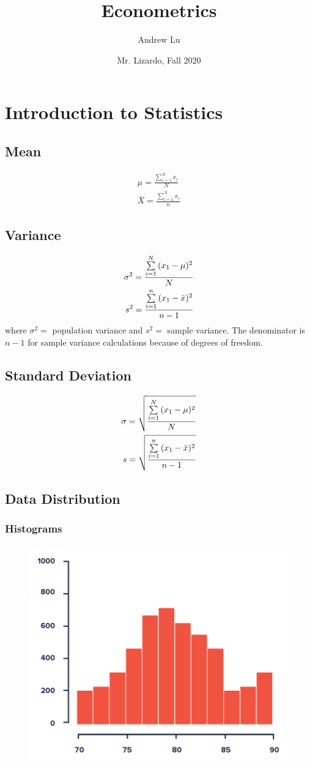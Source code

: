 \documentclass[12pt]{article}
\title{Econometrics}
\author{Andrew Lu}
\date{Mr. Lizardo, Fall 2020}
\numberwithin{equation}{section}
\begin{document}
    \maketitle
    \label{sec:top}
    \tableofcontents

\section{Introduction to Statistics}

\subsection{Mean}
\begin{align}
    \mu=\frac{\sum\limits_{i=1}^{N}{x_i}}{N} \\
    \overline{X}=\frac{\sum\limits_{i=1}^{N}{x_i}}{n}
\end{align}

\subsection{Variance}
\begin{align}
    \sigma^2=\frac{\sum\limits_{i=1}^{N}{(x_1-\mu)^2}}{N} \\
    s^2=\frac{\sum\limits_{i=1}^{n}{(x_1-\Bar{x})^2}}{n-1}
\end{align}
where $\sigma^2=$ population variance and $s^2=$ sample variance. The denominator is $n-1$ for sample variance calculations because of degrees of freedom.

\subsection{Standard Deviation}
\begin{align}
    \sigma=\sqrt{\frac{\sum\limits_{i=1}^{N}{(x_1-\mu)^2}}{N}} \\
    s=\sqrt{\frac{\sum\limits_{i=1}^{n}{(x_1-\Bar{x})^2}}{n-1}}
\end{align}

\subsection{Data Distribution}
\subsubsection{Histograms}
\begin{figure}[!ht]
    \centering
    \includegraphics[width=0.6\linewidth]{figures/histogram.png}
\end{figure}
\end{document}
